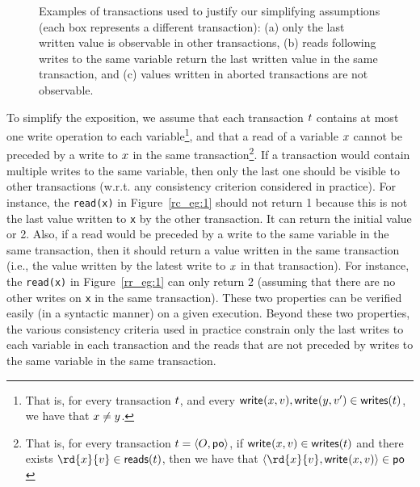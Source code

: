 \begin{figure}[t]
\begin{subfigure}{.14\textwidth}
{\begin{tikzpicture}[->,>=stealth',shorten >=1pt,auto,node distance=2cm,
     semithick, transform shape]
   \end{tikzpicture}  
  }
\caption{}
  \label{abort:1}
 \end{subfigure}
 \caption{Examples of transactions used to justify our simplifying assumptions (each box represents a different transaction): (a) only the last written value is observable in other transactions, (b) reads following writes to the same variable return the last written value in the same transaction, and (c) values written in aborted transactions are not observable.}
 \label{read_latest}
 \vspace{-3mm}
\end{figure}

To simplify the exposition, we assume that each transaction $\tr$ contains at most one write operation to each variable\footnote{That is, for every transaction $\tr$, and every $\wrt{\xvar}{\val}, \wrt{\yvar}{\val'}\in \writeOp{\tr}$, we have that $\xvar\neq\yvar$.}, and that a read of a variable $\xvar$ cannot be preceded by a write to $\xvar$ in the same transaction\footnote{That is, for every transaction $\tr=\tup{O, \po}$, if $\wrt{\xvar}{\val}\in \writeOp{\tr}$ and there exists $\rd{\xvar}{\val}\in \readOp{\tr}$, then we have that $\tup{\rd{\xvar}{\val},\wrt{\xvar}{\val}}\in \po$}. If a transaction would contain multiple writes to the same variable, then only the last one should be visible to other transactions (w.r.t. any consistency criterion considered in practice). For instance, the \texttt{read(x)} in Figure~\ref{rc_eg:1} should not return 1 because this is not the last value written to {\tt x} by the other transaction. It can return the initial value or 2.
Also, if a read would be preceded by a write to the same variable in the same transaction, then it should return a value written in the same transaction (i.e., the value written by the latest write to $\xvar$ in that transaction). 
For instance, the \texttt{read(x)} in Figure~\ref{rr_eg:1} can only return 2 (assuming that there are no other writes on {\tt x} in the same transaction).
These two properties can be verified easily (in a syntactic manner) on a given execution. Beyond these two properties, the various consistency criteria used in practice constrain only the last writes to each variable in each transaction and the reads that are not preceded by writes to the same variable in the same transaction.

